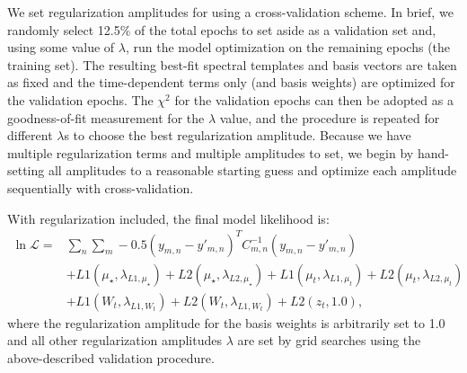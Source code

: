\documentclass[modern]{aastex62}
\begin{document}
We set regularization amplitudes for \wobble using a cross-validation scheme.
In brief, we randomly select 12.5\% of the total epochs to set aside as a validation set and, using some value of $\lambda$, run the model optimization on the remaining epochs (the training set).
The resulting best-fit spectral templates and basis vectors are taken as fixed and the time-dependent terms only (\RVs and basis weights) are optimized for the validation epochs.
The $\chi^2$ for the validation epochs can then be adopted as a goodness-of-fit measurement for the $\lambda$ value, and the procedure is repeated for different $\lambda$s to choose the best regularization amplitude.
Because we have multiple regularization terms and multiple amplitudes to set, we begin by hand-setting all amplitudes to a reasonable starting guess and optimize each amplitude sequentially with cross-validation.

With regularization included, the final model likelihood is:
\begin{equation}
\begin{split}
\ln \mathcal{L} = & \sum_{n} \sum_{m} -0.5 (y_{m,n} - y'_{m,n})^T C_{m,n}^{-1} (y_{m,n}-y'_{m,n})  \\
 & + L1(\mu_{\star}, \lambda_{L1, \mu_{\star}}) + L2(\mu_{\star}, \lambda_{L2, \mu_{\star}}) + L1(\mu_{t},  \lambda_{L1, \mu_{t}}) + L2(\mu_{t},  \lambda_{L2, \mu_{t}}) \\
 & + L1(W_t, \lambda_{L1, W_t}) + L2(W_t, \lambda_{L1, W_t}) + L2(z_t, 1.0) ,
\end{split}
\end{equation}
where the regularization amplitude for the basis weights is arbitrarily set to 1.0 and all other regularization amplitudes $\lambda$ are set by grid searches using the above-described validation procedure. 

\end{document}
